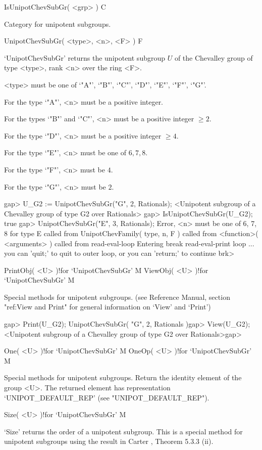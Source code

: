 \>IsUnipotChevSubGr( <grp> ) C

Category for unipotent subgroups.

\>UnipotChevSubGr( <type>, <n>, <F> ) F

`UnipotChevSubGr'  returns  the  unipotent  subgroup $U$ of the Chevalley
group of type <type>, rank <n> over the ring <F>.

<type> must be one of `"A"', `"B"', `"C"', `"D"', `"E"', `"F"', `"G"'.

For the type  `"A"', <n> must be a positive integer.

For the types `"B"' and `"C"', <n> must be a positive integer $\geq 2$.

For the type  `"D"', <n> must be a positive integer $\geq 4$.

For the type  `"E"', <n> must be one of $6, 7, 8$.

For the type  `"F"', <n> must be $4$.

For the type  `"G"', <n> must be $2$.


\beginexample
gap> U_G2 := UnipotChevSubGr("G", 2, Rationals);
<Unipotent subgroup of a Chevalley group of type G2 over Rationals>
gap> IsUnipotChevSubGr(U_G2);
true
\endexample
\begintt
gap> UnipotChevSubGr("E", 3, Rationals);
Error, <n> must be one of 6, 7, 8 for type E  called from
UnipotChevFamily( type, n, F ) called from
<function>( <arguments> ) called from read-eval-loop
Entering break read-eval-print loop ...
you can 'quit;' to quit to outer loop, or
you can 'return;' to continue
brk>
\endtt

\>PrintObj( <U> )!{for `UnipotChevSubGr'} M
\>ViewObj( <U> )!{for `UnipotChevSubGr'} M

Special methods for unipotent  subgroups.  (see  {\GAP} Reference Manual,
section  "ref:View  and  Print"  for general  information  on `View'  and
`Print')

\beginexample
gap> Print(U_G2);
UnipotChevSubGr( "G", 2, Rationals )gap> View(U_G2);
<Unipotent subgroup of a Chevalley group of type G2 over Rationals>gap>
\endexample

\>One( <U> )!{for `UnipotChevSubGr'} M
\>OneOp( <U> )!{for `UnipotChevSubGr'} M

Special  methods  for unipotent  subgroups. Return the  identity
element   of   the   group  <U>.   The   returned   element  has
representation `UNIPOT_DEFAULT_REP' (see "UNIPOT_DEFAULT_REP").


\>Size( <U> )!{for `UnipotChevSubGr'} M

`Size' returns  the order  of a unipotent subgroup.  This  is  a
special  method for  unipotent  subgroups  using the  result  in
Carter \cite{Car72}, Theorem 5.3.3 (ii).


